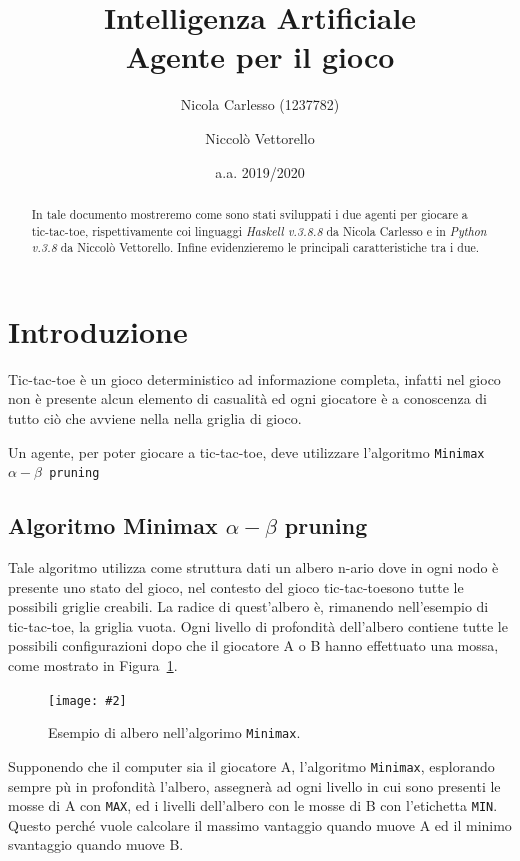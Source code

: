 \documentclass[11pt, a4paper]{article}
\title{Intelligenza Artificiale\\ Agente per il gioco \tic}
\author{Nicola Carlesso (1237782) \and Niccolò Vettorello}
\date{a.a. 2019/2020}
\newcommand{\tic}{tic-tac-toe}
\newcommand{\image}[4]{
	\begin{figure}[H]
		\centering
		\texttt{[image: \#2]}
		\caption{#3.}
		\label{#4}
	\end{figure}
}
\begin{document}
	
	\begin{titlepage}
		\maketitle
		\BgThispage
	\end{titlepage}

	\tableofcontents
	\clearpage
	
	\begin{abstract}
		In tale documento mostreremo come sono stati sviluppati i due agenti per giocare a \tic, rispettivamente coi linguaggi \textit{Haskell v.3.8.8} da Nicola Carlesso e in \textit{Python v.3.8} da Niccolò Vettorello. Infine evidenzieremo le principali caratteristiche tra i due.
	\end{abstract}

\section{Introduzione}
Tic-tac-toe è un gioco deterministico ad informazione completa, infatti nel gioco non è presente alcun elemento di casualità ed ogni giocatore è a conoscenza di tutto ciò che avviene nella nella griglia di gioco.

Un agente, per poter giocare a \tic, deve utilizzare l'algoritmo \texttt{Minimax $\alpha-\beta$ pruning}

\subsection{Algoritmo Minimax $\alpha-\beta$ pruning}
Tale algoritmo utilizza come struttura dati un albero n-ario dove in ogni nodo è presente uno stato del gioco, nel contesto del gioco \tic sono tutte le possibili griglie creabili. La radice di quest'albero è, rimanendo nell'esempio di \tic, la griglia vuota. Ogni livello di profondità dell'albero contiene tutte le possibili configurazioni dopo che il giocatore A o B hanno effettuato una mossa, come mostrato in Figura~\ref{tree}.

\image{0.5}{tree}{Esempio di albero nell'algorimo \texttt{Minimax}}{tree}

Supponendo che il computer sia il giocatore A, l'algoritmo \texttt{Minimax}, esplorando sempre pù in profondità l'albero, assegnerà ad ogni livello in cui sono presenti le mosse di A con \texttt{MAX}, ed i livelli dell'albero con le mosse di B con l'etichetta \texttt{MIN}. Questo perché vuole calcolare il massimo vantaggio quando muove A ed il minimo svantaggio quando muove B.
\end{document}
